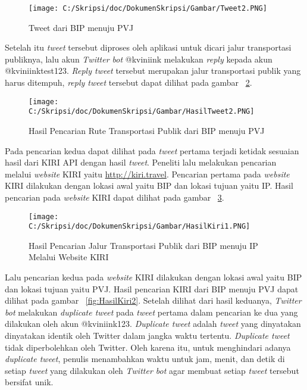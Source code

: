 \begin{enumerate}
	\begin{figure}
		\centering
			\texttt{[image: C:/Skripsi/doc/DokumenSkripsi/Gambar/Tweet2.PNG]}
		\caption{Tweet dari BIP menuju PVJ}
		\label{fig:Tweet2}
	\end{figure}
	
	Setelah itu \textit{tweet} tersebut diproses oleh aplikasi untuk dicari jalur transportasi publiknya, lalu akun \textit{Twitter bot} @kviniink melakukan \textit{reply} kepada akun @kviniinktest123. \textit{Reply tweet} tersebut merupakan jalur transportasi publik yang harus ditempuh, \textit{reply tweet} tersebut dapat dilihat pada gambar ~\ref{fig:HasilTweet2}.
	
	
	\begin{figure}
		\centering
			\texttt{[image: C:/Skripsi/doc/DokumenSkripsi/Gambar/HasilTweet2.PNG]}
		\caption{Hasil Pencarian Rute Transportasi Publik dari BIP menuju PVJ}
		\label{fig:HasilTweet2}
	\end{figure}
	
	Pada pencarian kedua dapat dilihat pada \textit{tweet} pertama terjadi ketidak sesuaian hasil dari KIRI API dengan hasil \textit{tweet}.
	Peneliti lalu melakukan pencarian melalui \textit{website} KIRI yaitu \url{http://kiri.travel}. Pencarian pertama pada \textit{website} KIRI dilakukan dengan lokasi awal yaitu BIP dan lokasi tujuan yaitu IP. Hasil pencarian pada \textit{website} KIRI dapat dilihat pada gambar ~\ref{fig:HasilKiri1}.
	
	
	\begin{figure}
		\centering
			\texttt{[image: C:/Skripsi/doc/DokumenSkripsi/Gambar/HasilKiri1.PNG]}
		\caption{Hasil Pencarian Jalur Transportasi Publik dari BIP menuju IP Melalui Website KIRI}
		\label{fig:HasilKiri1}
	\end{figure}
	
	Lalu pencarian kedua pada \textit{website} KIRI dilakukan dengan lokasi awal yaitu BIP dan lokasi tujuan yaitu PVJ. Hasil pencarian KIRI dari BIP menuju PVJ dapat dilihat pada gambar ~\ref{fig:HasilKiri2}. Setelah dilihat dari hasil keduanya, \textit{Twitter bot} melakukan \textit{duplicate tweet} pada \textit{tweet} pertama dalam pencarian ke dua yang dilakukan oleh akun @kviniink123. \textit{Duplicate tweet} adalah \textit{tweet} yang dinyatakan dinyatakan identik oleh Twitter dalam jangka waktu tertentu. \textit{Duplicate tweet} tidak diperbolehkan oleh Twitter. Oleh karena itu, untuk menghindari adanya \textit{duplicate tweet}, penulis menambahkan waktu untuk jam, menit, dan detik di setiap \textit{tweet} yang dilakukan oleh \textit{Twitter bot} agar membuat setiap \textit{tweet} tersebut bersifat unik.
	

\end{enumerate}
